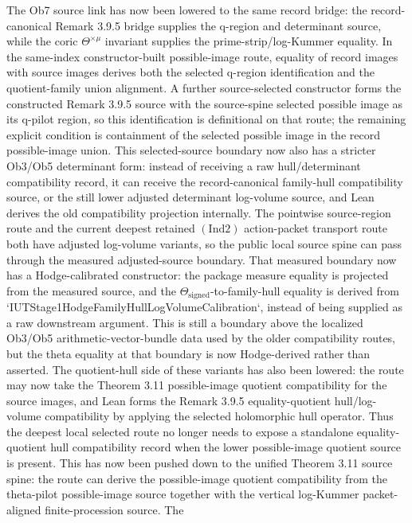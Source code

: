 \documentclass[11pt]{article}
\theoremstyle{plain}
\theoremstyle{definition}
\theoremstyle{remark}
\begin{document}
The Ob7 source link has now been lowered to the same record bridge: the
record-canonical Remark 3.9.5 bridge supplies the q-region and determinant
source, while the coric \(\Theta^{\times\mu}\) invariant supplies the
prime-strip/log-Kummer equality.  In the same-index constructor-built
possible-image route, equality of record images with source images derives both
the selected q-region identification and the quotient-family union alignment.
A further source-selected constructor forms the constructed Remark 3.9.5
source with the source-spine selected possible image as its q-pilot region, so
this identification is definitional on that route; the remaining explicit
condition is containment of the selected possible image in the record
possible-image union.  This selected-source boundary now also has a stricter
Ob3/Ob5 determinant form: instead of receiving a raw hull/determinant
compatibility record, it can receive the record-canonical family-hull
compatibility source, or the still lower adjusted determinant log-volume
source, and Lean derives the old compatibility projection internally.  The
pointwise source-region route and the current deepest retained
\((\mathrm{Ind}2)\) action-packet transport route both have adjusted
log-volume variants, so the public local source spine can pass through the
measured adjusted-source boundary.  That measured boundary now has a
Hodge-calibrated constructor: the package measure equality is projected from
the measured source, and the \(\Theta_{\mathrm{signed}}\)-to-family-hull
equality is derived from `IUTStage1HodgeFamilyHullLogVolumeCalibration`,
instead of being supplied as a raw downstream argument.  This is still a
boundary above the localized Ob3/Ob5 arithmetic-vector-bundle data used by the
older compatibility routes, but the theta equality at that boundary is now
Hodge-derived rather than asserted.  The quotient-hull side of these variants
has also been lowered: the route may now take the Theorem 3.11 possible-image
quotient compatibility for
the source images, and Lean forms the Remark 3.9.5 equality-quotient
hull/log-volume compatibility by applying the selected holomorphic hull
operator.  Thus the deepest local selected route no longer needs to expose a
standalone equality-quotient hull compatibility record when the lower
possible-image quotient source is present.  This has now been pushed down to
the unified Theorem 3.11 source spine: the route can derive the possible-image
quotient compatibility from the theta-pilot possible-image source together
with the vertical log-Kummer packet-aligned finite-procession source.  The
\end{document}
